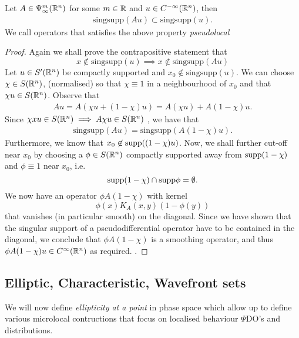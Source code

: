 \documentclass{article}
\begin{document}
\begin{fprop}
    Let $A \in \Psi^m_\infty({\mathbb R}^n)$ for some $m \in {\ensuremath {\mathbb R}}$ and $u \in C^{-\infty}({\mathbb R}^n)$, then 
    \begin{align*}
    \mathrm{sing supp}(A u) \subset \mathrm{sing supp }(u). 
    \end{align*}
    We call operators that satisfies the above property \textit{pseudolocal}
\end{fprop}
\begin{proof}
     Again we shall prove the contrapositive statement that 
    \[
    x \not \in \mathrm{sing supp}(u) \implies x \not \in \mathrm{sing supp}(Au)
    \]
    Let $u \in S'({\mathbb R}^n)$ be compactly supported and $x_0 \not \in \mathrm{sing supp}(u)$.  We can choose $\chi \in S({\mathbb R}^n)$, (normalised) so that $\chi \equiv 1$ in a neighbourhood of $x_0$ and that $\chi u \in S({\mathbb R}^n)$. Observe that 
    \begin{align*}
    Au = A(\chi u + (1 - \chi)u) = A(\chi u) + A(1 - \chi)u. 
    \end{align*}
    Since $\chi xu \in S({\mathbb R}^n) \implies A\chi u \in S({\mathbb R}^n)$ \cite{rbm lemma 2.3}, we have that 
    \begin{align*}
    \mathrm{singsupp}(Au) = \mathrm{singsupp}(A(1 - \chi)u). 
    \end{align*}
    Furthermore, we know that $x_0 \not \in \mathrm{supp}((1 - \chi)u)$. 
    Now, we shall further cut-off near $x_0$ by choosing a $\phi \in S({\mathbb R}^n)$ compactly supported  away from $\mathrm{supp}(1 - \chi)$ and $\phi \equiv 1$ near $x_0$, i.e. 
    \[
    \mathrm{supp}(1 - \chi) \cap \mathrm{supp} \phi = \emptyset. 
    \]
    We now have an operator $\phi A(1 - \chi) $ with kernel
    \[
    \phi(x) K_A(x, y) ( 1 - \phi(y))
    \]
    that vanishes (in particular smooth) on the diagonal. Since we have shown that the singular support of a pseudodifferential operator have to be contained in the diagonal, we conclude that $\phi A(1 - \chi)$ is a smoothing operator, and thus $\phi A (1 - \chi) u \in C^\infty({\mathbb R}^n)$ as required. .  
\end{proof}


\subsection{Elliptic, Characteristic, Wavefront sets}
We will now define \textit{ellipticity at a point} in phase space which allow up to define various microlocal contructions that focus on localised behaviour $\Psi$DO's and distributions. 
\end{document}

